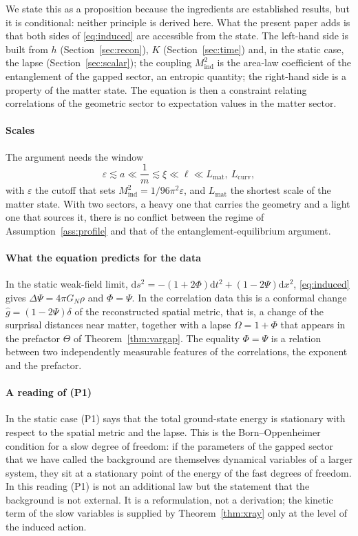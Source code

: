 \documentclass[11pt,a4paper]{article}
\theoremstyle{stmt}
\theoremstyle{defn}
\theoremstyle{rmk}
\numberwithin{equation}{section}
\newcommand{\dd}{\mathrm{d}}
\newcommand{\Lcurv}{L_{\mathrm{curv}}}
\begin{document}
We state this as a proposition because the ingredients are established results, but it is conditional: neither principle is derived here. What the present paper adds is that both sides of \eqref{eq:induced} are accessible from the state. The left-hand side is built from $h$ (Section~\ref{sec:recon}), $K$ (Section~\ref{sec:time}) and, in the static case, the lapse (Section~\ref{sec:scalar}); the coupling $M_{\mathrm{ind}}^2$ is the area-law coefficient of the entanglement of the gapped sector, an entropic quantity; the right-hand side is a property of the matter state. The equation is then a constraint relating correlations of the geometric sector to expectation values in the matter sector.

\paragraph{Scales} The argument needs the window
\begin{equation}
\varepsilon\lesssim a\ll\frac1m\lesssim\xi\ll\ell\ll L_{\mathrm{mat}},\ \Lcurv ,
\end{equation}
with $\varepsilon$ the cutoff that sets $M_{\mathrm{ind}}^2=1/96\pi^2\varepsilon$, and $L_{\mathrm{mat}}$ the shortest scale of the matter state. With two sectors, a heavy one that carries the geometry and a light one that sources it, there is no conflict between the regime of Assumption~\ref{ass:profile} and that of the entanglement-equilibrium argument.

\paragraph{What the equation predicts for the data} In the static weak-field limit, $\dd s^2=-(1+2\Phi)\dd t^2+(1-2\Psi)\dd x^2$, \eqref{eq:induced} gives $\Delta\Psi=4\pi G_N\rho$ and $\Phi=\Psi$. In the correlation data this is a conformal change $\hat g=(1-2\Psi)\delta$ of the reconstructed spatial metric, that is, a change of the surprisal distances near matter, together with a lapse $\Omega=1+\Phi$ that appears in the prefactor $\Theta$ of Theorem~\ref{thm:vargap}. The equality $\Phi=\Psi$ is a relation between two independently measurable features of the correlations, the exponent and the prefactor.

\paragraph{A reading of (P1)} In the static case (P1) says that the total ground-state energy is stationary with respect to the spatial metric and the lapse. This is the Born--Oppenheimer condition for a slow degree of freedom: if the parameters of the gapped sector that we have called the background are themselves dynamical variables of a larger system, they sit at a stationary point of the energy of the fast degrees of freedom. In this reading (P1) is not an additional law but the statement that the background is not external. It is a reformulation, not a derivation; the kinetic term of the slow variables is supplied by Theorem~\ref{thm:xray} only at the level of the induced action.
\end{document}
